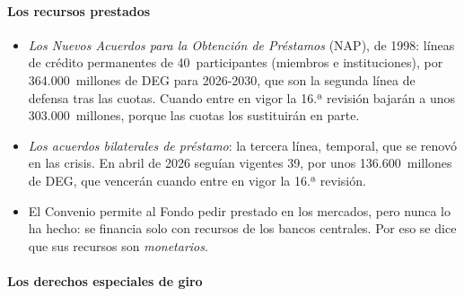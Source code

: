 \documentclass[11pt]{article}
\begin{document}
\paragraph{Los recursos prestados}

\begin{itemize}
\item \emph{Los Nuevos Acuerdos para la Obtención de Préstamos} (NAP), de 1998: líneas de crédito permanentes de 40~participantes (miembros e instituciones), por 364.000~millones de DEG para 2026-2030, que son la segunda línea de defensa tras las cuotas. Cuando entre en vigor la 16.ª revisión bajarán a unos 303.000~millones, porque las cuotas los sustituirán en parte\nocite{FMI2026InformeAnual}.
\item \emph{Los acuerdos bilaterales de préstamo}: la tercera línea, temporal, que se renovó en las crisis. En abril de 2026 seguían vigentes 39, por unos 136.600~millones de DEG, que vencerán cuando entre en vigor la 16.ª revisión\nocite{FMI2026InformeAnual}.
\item El Convenio permite al Fondo pedir prestado en los mercados, pero nunca lo ha hecho: se financia solo con recursos de los bancos centrales. Por eso se dice que sus recursos son \emph{monetarios}.
\end{itemize}

\paragraph{Los derechos especiales de giro}
\end{document}
